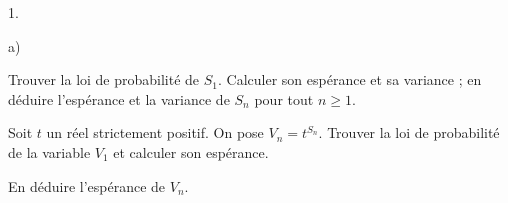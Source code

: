 \documentclass[11pt]{article}%
\begin{document}
\begin{noliste}{1.}
\begin{noliste}{a)}
 \setlength{\itemsep}{2mm}
\item Trouver la loi de probabilité de $S_{1}$. Calculer son espérance
et sa
variance ; en déduire l'espérance et la variance de $S_{n}$ pour tout
$n\ge
1.$

\item Soit $t$ un réel strictement positif. On pose $V_{n} =
t^{S_{n}}$.
Trouver la loi de probabilité de la variable $V_{1}$ et calculer son
espérance.

\item En déduire l'espérance de $V_{n}$.
\end{noliste}
\end{noliste}

\label{fin}
\end{document}
